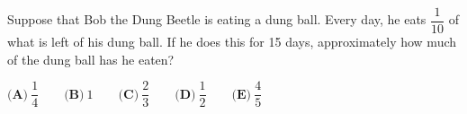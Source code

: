 Suppose that Bob the Dung Beetle is eating a dung ball. Every day, he eats $\dfrac{1}{10}$ of what is left of his dung ball. If he does this for 15 days, approximately how much of the dung ball has he eaten?

$\textbf{(A)}~\dfrac{1}{4}\qquad\textbf{(B)}~1\qquad\textbf{(C)}~\dfrac{2}{3}\qquad\textbf{(D)}~\dfrac{1}{2}\qquad\textbf{(E)}~\dfrac{4}{5}\qquad$
